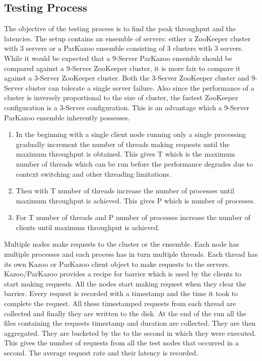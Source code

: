 \subsection{Testing Process}
The objective of the testing process is to find the peak throughput and the latencies. The setup contains an ensemble of servers: either a ZooKeeper cluster with 3 servers or a ParKazoo ensemble consisting of 3 clusters with 3 servers. While it would be expected that a 9-Server ParKazoo ensemble should be compared against a 9-Server ZooKeeper cluster, it is more fair to compare it against a 3-Server ZooKeeper cluster. Both the 3-Server ZooKeeper cluster and 9-Server cluster can tolerate a single server failure. Also since the performance of a cluster is inversely proportional to the size of cluster, the fastest ZooKeeper configuration is a 3-Server configuration. This is an advantage which a 9-Server ParKazoo ensemble inherently possesses.

\begin{enumerate}
  \item In the beginning with a single client node running only a single processing gradually increment the number of threads making requests until the maximum throughput is obtained. This gives T which is the maximum number of threads which can be run before the performance degrades due to context switching and other threading limitations.
  \item Then with T number of threads increase the number of processes until maximum throughput is achieved. This gives P which is number of processes.
  \item For T number of threads and P number of processes increase the number of clients until maximum throughput is achieved.
\end{enumerate}












Multiple nodes make requests to the cluster or the ensemble. Each node has multiple processes and each process has in turn multiple threads. Each thread has its own Kazoo or ParKazoo client object to make requests to the servers.
Kazoo/ParKazoo provides a recipe for barrier which is used by the clients to start making requests. All the nodes start making request when they clear the barrier. Every request is recorded with a timestamp and the time it took to complete the request. All these timestamped requests from each thread are collected and finally they are written to the disk. At the end of the run all the files containing the requests timestamp and duration are collected. They are then aggregated. They are bucketed by the to the second in which they were executed. This gives the number of requests from all the test nodes that occurred in a second. The average request rate and their latency is recorded. 

